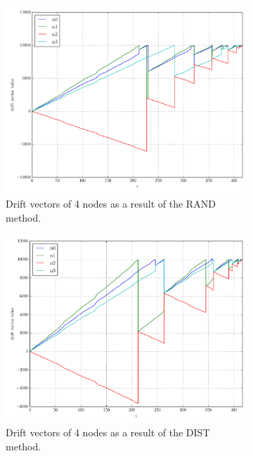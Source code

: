 \begin{figure}[!b]
\begin{subfigure}{0.32\textwidth}
  \includegraphics[width=\linewidth]{img/matchings_classic_random_drifts.pdf}
  \caption{Drift vectors of 4 nodes as a result of the RAND method.}
\end{subfigure}\hfill
\begin{subfigure}{0.32\textwidth}
  \includegraphics[width=\linewidth]{img/matchings_classic_distoptpair_drifts.pdf}
  \caption{Drift vectors of 4 nodes as a result of the DIST method.}
\end{subfigure}\hfill
\begin{subfigure}{0.32\textwidth}%

\end{subfigure}
\end{figure}
